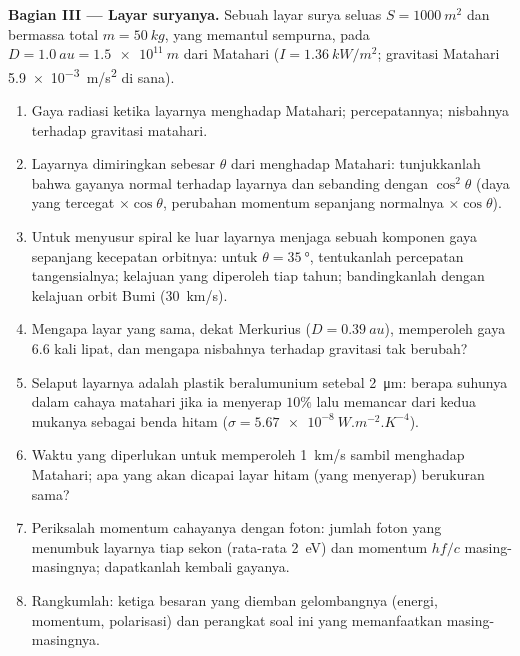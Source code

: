 \begin{problem}
\medskip
\noindent\textbf{Bagian III --- Layar suryanya.}
Sebuah layar surya seluas $S = \qty{1000}{m^2}$ dan bermassa total $m = \qty{50}{kg}$,
yang memantul sempurna, pada $D = \qty{1.0}{au} = \qty{1.5e11}{m}$ dari Matahari
($I = \qty{1.36}{kW/m^2}$; gravitasi Matahari \qty{5.9e-3}{m/s^2} di sana).
\begin{enumerate}[resume]
  \item Gaya radiasi ketika layarnya menghadap Matahari; percepatannya;
        nisbahnya terhadap gravitasi matahari.
  \item Layarnya dimiringkan sebesar $\theta$ dari menghadap Matahari: tunjukkanlah bahwa
        gayanya normal terhadap layarnya dan sebanding dengan $\cos^2\theta$
        (daya yang tercegat $\times\cos\theta$, perubahan momentum sepanjang
        normalnya $\times\cos\theta$).
  \item Untuk menyusur spiral ke luar layarnya menjaga sebuah komponen gaya sepanjang
        kecepatan orbitnya: untuk $\theta = \qty{35}{\degree}$, tentukanlah percepatan
        tangensialnya; kelajuan yang diperoleh tiap tahun; bandingkanlah dengan kelajuan
        orbit Bumi (\qty{30}{km/s}).
  \item Mengapa layar yang sama, dekat Merkurius ($D = \qty{0.39}{au}$), memperoleh
        gaya $6.6$ kali lipat, dan mengapa nisbahnya terhadap gravitasi
        tak berubah?
  \item Selaput layarnya adalah plastik beralumunium setebal \qty{2}{\micro m}: berapa
        suhunya dalam cahaya matahari jika ia menyerap $10\%$ lalu memancar dari
        kedua mukanya sebagai benda hitam ($\sigma = \qty{5.67e-8}{W.m^{-2}.K^{-4}}$).
  \item Waktu yang diperlukan untuk memperoleh \qty{1}{km/s} sambil menghadap Matahari; apa yang akan
        dicapai layar hitam (yang menyerap) berukuran sama?
  \item Periksalah momentum cahayanya dengan foton: jumlah foton yang
        menumbuk layarnya tiap sekon (rata-rata \qty{2}{eV}) dan
        momentum $hf/c$ masing-masingnya; dapatkanlah kembali gayanya.
  \item Rangkumlah: ketiga besaran yang diemban gelombangnya (energi,
        momentum, polarisasi) dan perangkat soal ini yang memanfaatkan
        masing-masingnya.
\end{enumerate}
\end{problem}
